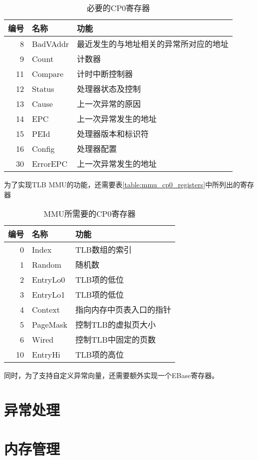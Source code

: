 \begin{table}[!htbp]
    \centering
    \begin{tabular}{|r|l|l|}
    \hline
    \textbf{编号} & \textbf{名称} & \textbf{功能}  \\ \hline
	8 & BadVAddr & 最近发生的与地址相关的异常所对应的地址 \\ \hline
	9 & Count & 计数器 \\ \hline
	11 & Compare & 计时中断控制器 \\ \hline
	12 & Status & 处理器状态及控制 \\ \hline
	13 & Cause & 上一次异常的原因 \\ \hline
	14 & EPC & 上一次异常发生的地址 \\ \hline
	15 & PEId & 处理器版本和标识符 \\ \hline
	16 & Config & 处理器配置 \\ \hline
	30 & ErrorEPC & 上一次异常发生的地址 \\ \hline
    \end{tabular}
    \caption{必要的CP0寄存器}
    \label{table:required_cp0_registers}
\end{table}

为了实现TLB MMU的功能，还需要表\ref{table:mmu_cp0_registers}中所列出的寄存器

\begin{table}[!htbp]
    \centering
    \begin{tabular}{|r|l|l|}
    \hline
    \textbf{编号} & \textbf{名称} & \textbf{功能}  \\ \hline
	0 & Index & TLB数组的索引 \\ \hline
	1 & Random & 随机数 \\ \hline
	2 & EntryLo0 & TLB项的低位 \\ \hline
	3 & EntryLo1 & TLB项的低位 \\ \hline
	4 & Context & 指向内存中页表入口的指针 \\ \hline
	5 & PageMask & 控制TLB的虚拟页大小 \\ \hline
	6 & Wired & 控制TLB中固定的页数 \\ \hline
	10 & EntryHi & TLB项的高位 \\ \hline
    \end{tabular}
    \caption{MMU所需要的CP0寄存器}
    \label{table:required_cp0_registers}
\end{table}

同时，为了支持自定义异常向量，还需要额外实现一个EBase寄存器。

\section{异常处理}

\section{内存管理}


